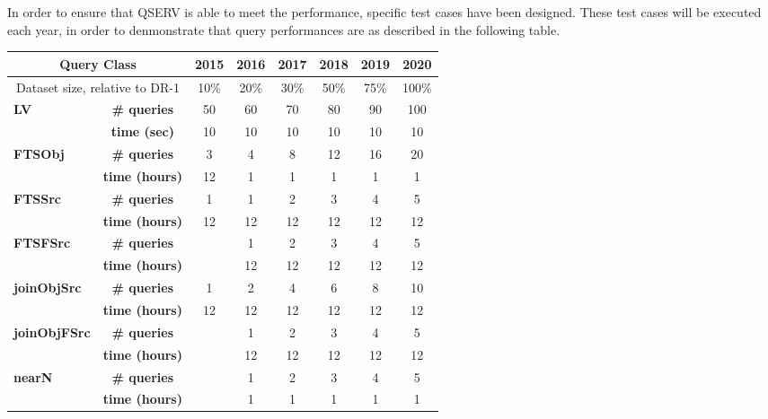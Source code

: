 \documentclass[DM,STS,toc]{lsstdoc}
\begin{document}
In order to ensure that QSERV is able to meet the performance, specific test cases have been designed.
These test cases will be executed each year, in order to denmonstrate that query performances are as described in the following table.


    \begin{tabular}{lccccccc}\hline
      \multicolumn{2}{c}{\textbf{Query Class}}
        &\textbf{2015}&\textbf{2016}&\textbf{2017}&\textbf{2018}&\textbf{2019}&\textbf{2020}\\\hline
      \multicolumn{2}{c}{Dataset size, relative to DR-1} 
                              & 10\% & 20\% & 30\% & 50\% & 75\% & 100\% \\ \hline
      \multirow{2}{*}{\textbf{LV}}
        &\textbf{\# queries}  & 50   & 60   & 70   & 80   & 90   & 100 \\%
        &\textbf{time (sec)}  & 10   & 10   & 10   & 10   & 10   &  10 \\\hline
      \multirow{2}{*}{\textbf{FTSObj}}
        &\textbf{\# queries}  &  3 &  4 &  8 & 12 & 16 &  20 \\%
        &\textbf{time (hours)}& 12 &  1 &  1 &  1 &  1 &   1 \\\hline
      \multirow{2}{*}{\textbf{FTSSrc}}
        &\textbf{\# queries}  &  1 &  1 &  2 &  3 &  4 &   5 \\%
        &\textbf{time (hours)}& 12 & 12 & 12 & 12 & 12 &  12 \\\hline
      \multirow{2}{*}{\textbf{FTSFSrc}}
        &\textbf{\# queries}  &    &  1 &  2 &  3 &  4 &   5 \\%
        &\textbf{time (hours)}&    & 12 & 12 & 12 & 12 &  12 \\\hline
      \multirow{2}{*}{\textbf{joinObjSrc}}
        &\textbf{\# queries}  &  1 &  2 &  4 &  6 &  8 &  10 \\%
        &\textbf{time (hours)}& 12 & 12 & 12 & 12 & 12 &  12 \\\hline
      \multirow{2}{*}{\textbf{joinObjFSrc}}
        &\textbf{\# queries}  &    &  1 &  2 &  3 &  4 &   5 \\%
        &\textbf{time (hours)}&    & 12 & 12 & 12 & 12 &  12 \\\hline
      \multirow{2}{*}{\textbf{nearN}}
        &\textbf{\# queries}  &    &  1 &  2 &  3 &  4 &   5 \\%
        &\textbf{time (hours)}&    &  1 &  1 &  1 &  1 &   1 \\\hline
    \end{tabular}
\end{document}
